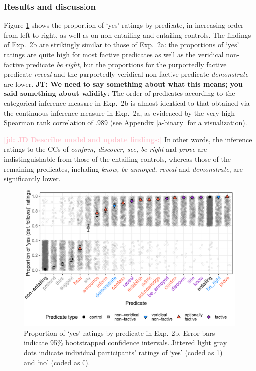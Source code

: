 \documentclass[11pt,fleqn]{article}
\newcommand{\jd}[1]{\textbf{\textcolor{Pink}{[jd: #1]}}}
\newcommand{\6}{\mbox{$[\hspace*{-.6mm}[$}}
\newcommand{\9}{\mbox{$]\hspace*{-.6mm}]$}}
\newcommand{\jt}[1]{\textbf{\color{blue}JT: #1}}
\begin{document}
\subsubsection{Results and discussion}

Figure \ref{fig:2bresults} shows the proportion of `yes' ratings by predicate, in increasing order from left to right, as well as on non-entailing and entailing controls. The findings of Exp.~2b are strikingly similar to those of Exp.~2a: the proportions of `yes' ratings are quite high for most factive predicates as well as the veridical non-factive predicate {\em be right}, but the proportions for the purportedly factive predicate {\em reveal} and the purportedly veridical non-factive predicate {\em demonstrate} are lower. \jt{We need to say something about what this means; you said something about validity:} The order of predicates according to the categorical inference measure in  Exp.~2b is almost identical to that obtained via the continuous inference measure in Exp.~2a, as evidenced by the very high Spearman rank correlation of .989 (see Appendix \ref{a-binary} for a visualization). 

\jd{JD Describe model and update findings:} In other words, the inference ratings to the CCs of {\em confirm, discover, see, be right} and {\em prove} are indistinguishable from those of the entailing controls, whereas those of the remaining predicates, including {\em know, be annoyed, reveal} and {\em demonstrate}, are significantly lower. 
 
\begin{figure}[H]
\centering
\includegraphics[width=.7\paperwidth]{../../results/7-veridicality3-binary/graphs/proportion-by-predicate-variability-individual}

\caption{Proportion of `yes' ratings by predicate in Exp.~2b. Error bars indicate 95\% bootstrapped confidence intervals. Jittered light gray dots indicate individual participants' ratings of `yes' (coded as 1) and `no' (coded as 0).}
\label{fig:2bresults}
\end{figure}
\end{document}
